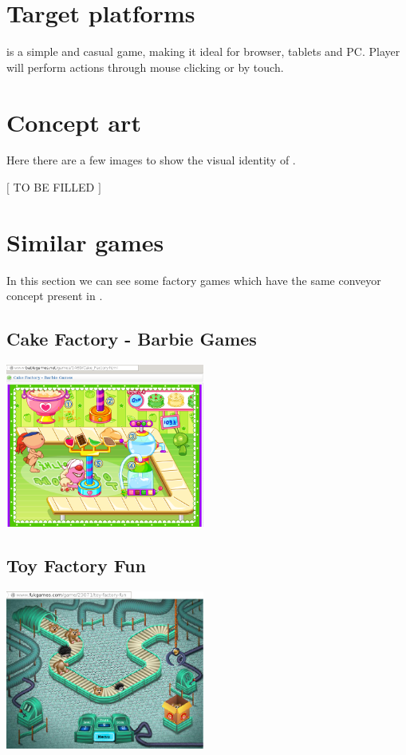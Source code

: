 \documentclass[a4paper]{scrartcl}
\begin{document}
\section{Target platforms}
    \gamename is a simple and casual game, making it ideal for browser, tablets
    and PC. Player will perform actions through mouse clicking or by touch.

\section{Concept art}
    Here there are a few images to show the visual identity of \gamename.

    \centering
    $[$ TO BE FILLED $]$

\section{Similar games}
    In this section we can see some factory games which have the same conveyor
    concept present in \gamename.

    \begin{multicols}{2}
        \subsection{Cake Factory - Barbie Games}
            \includegraphics[width=0.49\textwidth]{similar_games/CakeFactory}

        \subsection{Toy Factory Fun}
            \includegraphics[width=0.49\textwidth]{similar_games/ToyFactoryFun}
    \end{multicols}
\end{document}
